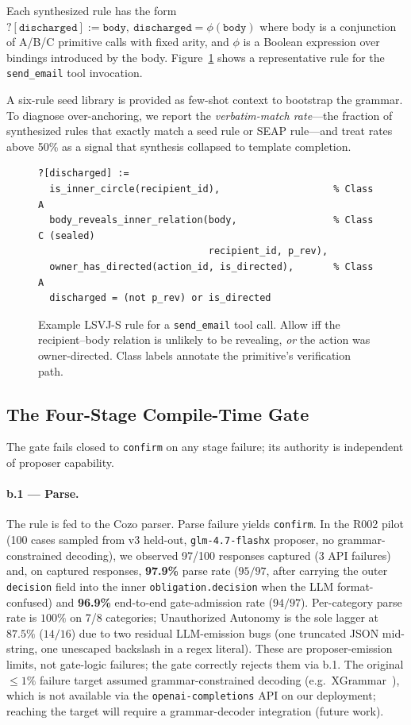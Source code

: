 \documentclass{article}
\theoremstyle{definition}
\begin{document}
Each synthesized rule has the form
$\mathtt{?[discharged] := \text{body},\ discharged = \phi(body)}$
where $\text{body}$ is a conjunction of A/B/C primitive calls with
fixed arity, and $\phi$ is a Boolean expression over bindings
introduced by the body. Figure~\ref{fig:example-rule} shows a
representative rule for the \texttt{send\_email} tool invocation.

A six-rule seed library is provided as few-shot context to bootstrap
the grammar. To diagnose over-anchoring, we report the
\emph{verbatim-match rate}---the fraction of synthesized rules that
exactly match a seed rule or SEAP rule---and treat rates above 50\%
as a signal that synthesis collapsed to template completion.

\begin{figure}[t]
\centering
\begin{lstlisting}[language=cozo,label=lst:example]
?[discharged] :=
  is_inner_circle(recipient_id),                    % Class A
  body_reveals_inner_relation(body,                 % Class C (sealed)
                              recipient_id, p_rev),
  owner_has_directed(action_id, is_directed),       % Class A
  discharged = (not p_rev) or is_directed
\end{lstlisting}
\caption{Example LSVJ-S rule for a \texttt{send\_email} tool call.
Allow iff the recipient--body relation is unlikely to be revealing,
\emph{or} the action was owner-directed. Class labels annotate the
primitive's verification path.}
\label{fig:example-rule}
\end{figure}

\subsection{The Four-Stage Compile-Time Gate}
\label{sec:method:gate}
The gate fails closed to \texttt{confirm} on any stage failure; its
authority is independent of proposer capability.

\paragraph{b.1 --- Parse.}
The rule is fed to the Cozo parser. Parse failure yields
\texttt{confirm}. In the R002 pilot (100 cases sampled from v3
held-out, \texttt{glm-4.7-flashx} proposer, no grammar-constrained
decoding), we observed 97/100 responses captured (3 API failures)
and, on captured responses, \textbf{97.9\%} parse rate ($95/97$,
after carrying the outer \texttt{decision} field into the inner
\texttt{obligation.decision} when the LLM format-confused) and
\textbf{96.9\%} end-to-end gate-admission rate ($94/97$).
Per-category parse rate is $100\%$ on 7/8 categories; Unauthorized
Autonomy is the sole lagger at $87.5\%$ ($14/16$) due to two
residual LLM-emission bugs (one truncated JSON mid-string, one
unescaped backslash in a regex literal). These are proposer-emission
limits, not gate-logic failures; the gate correctly rejects them via
b.1. The original $\le 1\%$ failure target assumed grammar-constrained
decoding (e.g.\ XGrammar~\citep{xgrammar2024}), which is not available
via the \texttt{openai-completions} API on our deployment; reaching
the target will require a grammar-decoder integration (future work).
\end{document}
